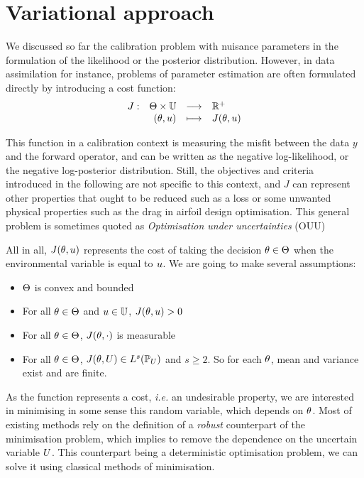\documentclass[../../Main_ManuscritThese.tex]{subfiles}
\begin{document}
\clearpage
\section{Variational approach}
\label{sec:J_rv}
We discussed so far the calibration problem with nuisance parameters
in the formulation of the likelihood or the posterior
distribution. However, in data assimilation for instance, problems of
parameter estimation are often formulated directly by introducing a
cost function:
\begin{equation}
  \begin{array}{rrcl}
    J: &\Theta \times \mathbb{U} &\longrightarrow& \mathbb{R}^+ \\
    &(\theta, u) &\longmapsto &J(\theta, u)
    \end{array}
  \end{equation}
  
  This function in a calibration context is measuring the misfit
  between the data $y$ and the forward operator, and can be written as
  the negative log-likelihood, or the negative log-posterior
  distribution. Still, the objectives and criteria introduced in the
  following are not specific to this context, and $J$ can represent
  other properties that ought to be reduced such as a loss or some
  unwanted physical properties such as the drag in airfoil design
  optimisation. This general problem is sometimes quoted as
  \emph{Optimisation under uncertainties} (OUU)
  \citep{cook_effective_2018,seshadri_density-matching_2014}


All in all, $J(\theta, u)$ represents the cost of taking the decision
$\theta\in\Theta$ when the environmental variable is equal to $u$.  We
are going to make several assumptions:
\begin{itemize}
\item $\Theta$ is convex and bounded 
\item For all $\theta \in \Theta$ and $u \in \mathbb{U}$, $J(\theta, u)>0$
\item For all $\theta \in \Theta$, $J(\theta, \cdot)$ is measurable
\item For all $\theta \in \Theta$, $J(\theta, U) \in L^s(\mathbb{P}_{U})$
  and $s \geq 2$. So for each $\theta$, mean and variance exist and are
  finite.
\end{itemize}

As the function represents a cost, \emph{i.e.} an undesirable
property, we are interested in minimising in some sense this random
variable, which depends on $\theta$.  Most of existing methods rely on
the definition of a \emph{robust} counterpart of the minimisation
problem, which implies to remove the dependence on the uncertain
variable $U$. This counterpart being a deterministic optimisation
problem, we can solve it using classical methods of minimisation.
\end{document}
